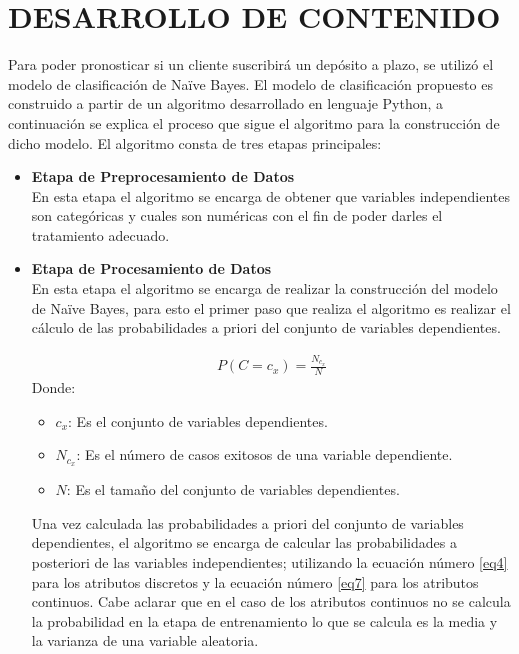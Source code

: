 \documentclass[letterpaper, 10 pt, conference]{ieeeconf}
\begin{document}
\section{DESARROLLO DE CONTENIDO}

Para poder  pronosticar si un cliente suscribirá un depósito a plazo, se utilizó el modelo de clasificación de Naïve Bayes. El modelo de clasificación propuesto es construido a partir de un algoritmo desarrollado en lenguaje Python, a continuación se explica el proceso que sigue el algoritmo para la construcción de dicho modelo. El algoritmo consta de tres etapas principales:\\

\begin{itemize}[leftmargin=*]
    \item \textbf{Etapa de Preprocesamiento de Datos\\} 
    En esta etapa el algoritmo se encarga de obtener que variables independientes son categóricas y cuales son numéricas con el fin de poder darles el tratamiento adecuado.\\
    
    \item \textbf{Etapa de Procesamiento de Datos\\}
    En esta etapa el algoritmo se encarga de realizar la construcción del modelo de Naïve Bayes, para esto el primer paso que realiza el algoritmo es realizar el cálculo de las probabilidades a priori del conjunto de variables dependientes.

    \begin{equation} \label{eq8}
    \begin{split}
    P(C=c_x) = \frac{N_c_x}{N}
    \end{split}
    \end{equation}
    Donde:
    \begin{itemize}[leftmargin=*]
        \item[] $c_x$: Es el conjunto de variables dependientes.
        \item[] $N_c_x$: Es el número de casos exitosos de una variable dependiente.
        \item[] $N$: Es el tamaño del conjunto de variables dependientes.\\
    \end{itemize}{}
    
    Una vez calculada las probabilidades a priori del conjunto de variables dependientes, el algoritmo se encarga de calcular las probabilidades a posteriori de las variables independientes; utilizando la ecuación número \ref{eq4} para los atributos discretos y la ecuación número \ref{eq7} para los atributos continuos. Cabe aclarar que en el caso de los atributos continuos no se calcula la probabilidad en la etapa de entrenamiento lo que se calcula es la media y la varianza de una variable aleatoria.
    


\end{itemize}
\end{document}
